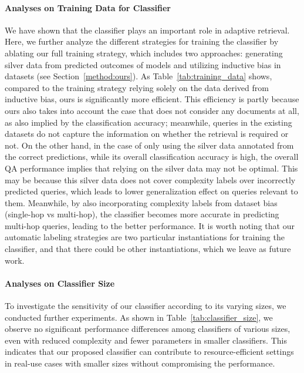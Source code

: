 \paragraph{Analyses on Training Data for Classifier}
We have shown that the classifier plays an important role in adaptive retrieval. Here, we further analyze the different strategies for training the classifier by ablating our full training strategy, which includes two approaches: generating silver data from predicted outcomes of models and utilizing inductive bias in datasets (see Section~\ref{method:ours}). As Table~\ref{tab:training_data} shows, compared to the training strategy relying solely on the data derived from inductive bias, ours is significantly more efficient. This efficiency is partly because ours also takes into account the case that does not consider any documents at all, as also implied by the classification accuracy; meanwhile, queries in the existing datasets do not capture the information on whether the retrieval is required or not. On the other hand, in the case of only using the silver data annotated from the correct predictions, while its overall classification accuracy is high, the overall QA performance implies that relying on the silver data may not be optimal. This may be because this silver data does not cover complexity labels over incorrectly predicted queries, which leads to lower generalization effect on queries relevant to them. Meanwhile, by also incorporating complexity labels from dataset bias (single-hop vs multi-hop), the classifier becomes more accurate in predicting multi-hop queries, leading to the better performance. It is worth noting that our automatic labeling strategies are two particular instantiations for training the classifier, and that there could be other instantiations, which we leave as future work.







\paragraph{Analyses on Classifier Size}
To investigate the sensitivity of our classifier according to its varying sizes, we conducted further experiments. As shown in Table~\ref{tab:classifier_size}, we observe no significant performance differences among classifiers of various sizes, even with reduced complexity and fewer parameters in smaller classifiers. This indicates that our proposed classifier can contribute to resource-efficient settings in real-use cases with smaller sizes without compromising the performance.




